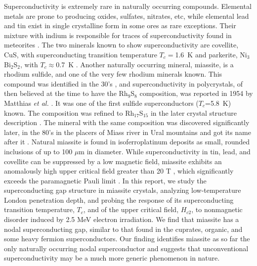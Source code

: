 \documentclass[aps,pra,reprint,superscriptaddress,floatfix]{revtex4-2}
\begin{document}
Superconductivity is extremely rare in naturally occurring compounds. 
{Elemental metals are prone to producing oxides, sulfates, nitrates, etc, while elemental lead and tin exist in single crystalline form in some ores as rare exceptions.}
Their mixture with indium is responsible for traces of superconductivity found in meteorites \cite{meteorite}. 
{The two minerals known to show superconductivity are covellite, CuS, with superconducting transition temperature $T_c=$1.6~K \cite{covellite,DI-BENEDETTO2006} and parkerite, Ni$_3$Bi$_2$S$_2$, with $T_c\approx$0.7~K \cite{Sakamoto2006,Lin2012}.} 
Another naturally occurring mineral, miassite, is a rhodium sulfide, and one of the very few rhodium minerals known. 
This compound was identified in the 30's \cite{RhSphasediagram}, and superconductivity in polycrystals, of then believed at the time to have the Rh$_9$S$_8$ composition, was reported in 1954 by Matthias {\it et al.} \cite{Matthias1954}. 
It was one of the first sulfide superconductors ($T_c$=5.8~K) known. 
The composition was refined to Rh$_{17}$S$_{15}$ in the later crystal structure description \cite{Geller1962}.  
The mineral with the same composition was discovered significantly later, in the 80's \cite{mineraldiscovery} in the placers of Miass river in Ural mountains and got its name after it \cite{mineraldiscovery,Naren2008}.  
Natural miassite is found in isoferroplatinum deposits as small, rounded inclusions of up to 100 $\mu$m in diameter.
While superconductivity in tin, lead, and covellite \cite{DI-BENEDETTO2006,Casaca2011} can be suppressed by a low magnetic field, miassite exhibits an anomalously high upper critical field greater than 20 T \cite{Settai2010}, which significantly exceeds the paramagnetic Pauli limit \cite{Naren2008}.
In this report, we study the superconducting gap structure in miassite crystals, analyzing low-temperature London penetration depth, and probing the response of its superconducting transition temperature, $T_c$, and of the upper critical field, $H_{c2}$, to nonmagnetic disorder induced by 2.5 MeV electron irradiation. 
We find that miassite has a nodal superconducting gap, similar to that found in the cuprates, organic, and some heavy fermion superconductors.  
Our finding identifies miassite as so far the only naturally occurring nodal superconductor and suggests that unconventional superconductivity may be a much more generic phenomenon in nature. 
\end{document}
